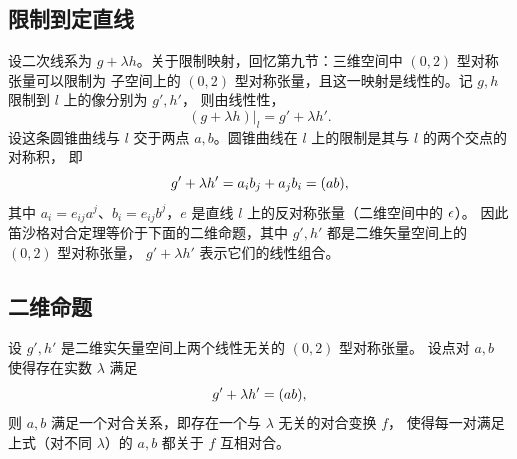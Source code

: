 \subsection{限制到定直线}

设二次线系为 $g+\lambda h$。关于限制映射，回忆第九节：三维空间中 $(0,2)$ 型对称张量可以限制为
子空间上的 $(0,2)$ 型对称张量，且这一映射是线性的。记 $g,h$ 限制到 $l$ 上的像分别为 $g',h'$，
则由线性性，
\[
(g+\lambda h)\big|_l=g'+\lambda h'.
\]
设这条圆锥曲线与 $l$ 交于两点 $a,b$。圆锥曲线在 $l$ 上的限制是其与 $l$ 的两个交点的对称积，
即
\[
g'+\lambda h'=a_ib_j+a_jb_i=(ab),
\]
其中 $a_i=e_{ij}a^j$、$b_i=e_{ij}b^j$，$e$ 是直线 $l$ 上的反对称张量（二维空间中的 $\epsilon$）。
因此笛沙格对合定理等价于下面的二维命题，其中 $g',h'$ 都是二维矢量空间上的 $(0,2)$ 型对称张量，
$g'+\lambda h'$ 表示它们的线性组合。

\subsection{二维命题}

\begin{proposition}[二维对合命题]\label{prop:2d-involution}
设 $g',h'$ 是二维实矢量空间上两个线性无关的 $(0,2)$ 型对称张量。
设点对 $a,b$ 使得存在实数 $\lambda$ 满足
\[
g'+\lambda h'=(ab) ,
\]
则 $a,b$ 满足一个对合关系，即存在一个与 $\lambda$ 无关的对合变换 $f$，
使得每一对满足上式（对不同 $\lambda$）的 $a,b$ 都关于 $f$ 互相对合。
\end{proposition}

